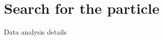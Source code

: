 
\setcounter{chapter}{5}
\chapter{Search for the particle}\label{ch:analyisis}

Data analysis details